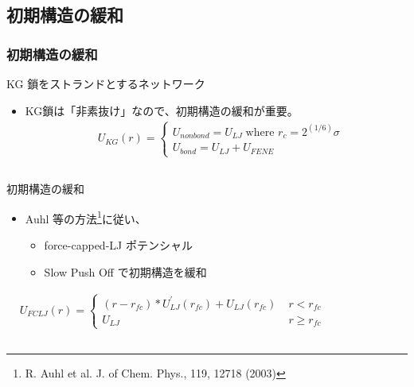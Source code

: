 \documentclass[12pt, dvipdfmx]{beamer}
\begin{document}
\subsection{初期構造の緩和}
\begin{frame}
    \frametitle{初期構造の緩和}
        \vspace{-2mm}
		\begin{block}{KG 鎖をストランドとするネットワーク}
			\begin{itemize}
				\item KG鎖は「非素抜け」なので、\alert{初期構造の緩和}が重要。
				\vspace{-3mm}
					\fontsize{6pt}{0pt}
					\begin{align*}
						&U_{KG}(r) = 
						\begin{cases}
						U_{nonbond} = U_{LJ} \;\text{where } r_c = 2^{(1/6)}\sigma \\
						U_{bond} = U_{LJ} + U_{FENE}
						\end{cases} 
					\end{align*}
			\end{itemize}
		\end{block}
		\vspace{-3mm}
		\begin{columns}[T, onlytextwidth]
				\begin{exampleblock}{初期構造の緩和}
					\begin{itemize}
						\item Auhl 等の方法\footnote{
							\scriptsize{R. Auhl et al. J. of Chem. Phys., 119, 12718 (2003)}
						}に従い、
						\begin{itemize}
							\item force-capped-LJ ポテンシャル
							\item Slow Push Off で初期構造を緩和
						\end{itemize}
					\end{itemize}
					\vspace{-3mm}
					\fontsize{6pt}{0pt}
					\begin{align*}
						&U_{FCLJ}(r) = 
						\begin{cases}
						(r-r_{fc})*U_{LJ}^{\prime}(r_{fc}) + U_{LJ}(r_{fc}) \; &r< r_{fc} \\
						U_{LJ}   \;\;\;\;\;\;\; &r \geq r_{fc}
						\end{cases} 
					\end{align*}
				\end{exampleblock}
				\vspace{2mm}

\end{columns}
\end{frame}
\end{document}
